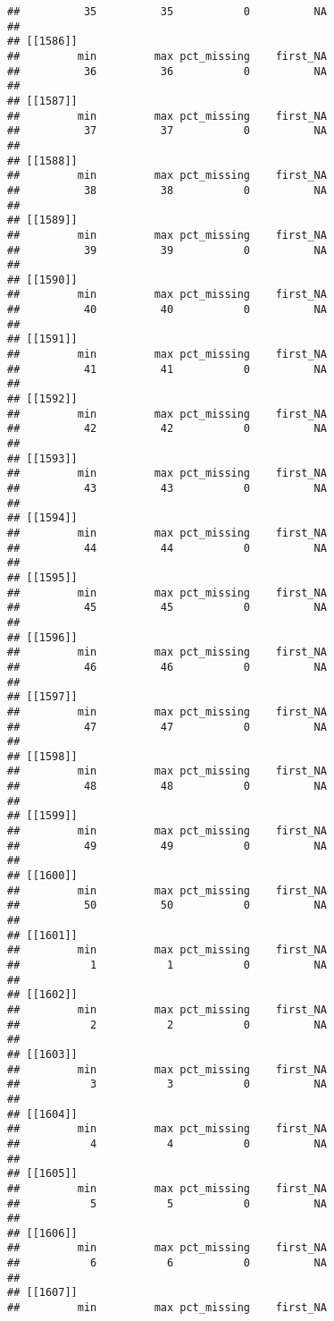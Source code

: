 \documentclass[
]{article}
\begin{document}
\begin{verbatim}
##          35          35           0          NA 
## 
## [[1586]]
##         min         max pct_missing    first_NA 
##          36          36           0          NA 
## 
## [[1587]]
##         min         max pct_missing    first_NA 
##          37          37           0          NA 
## 
## [[1588]]
##         min         max pct_missing    first_NA 
##          38          38           0          NA 
## 
## [[1589]]
##         min         max pct_missing    first_NA 
##          39          39           0          NA 
## 
## [[1590]]
##         min         max pct_missing    first_NA 
##          40          40           0          NA 
## 
## [[1591]]
##         min         max pct_missing    first_NA 
##          41          41           0          NA 
## 
## [[1592]]
##         min         max pct_missing    first_NA 
##          42          42           0          NA 
## 
## [[1593]]
##         min         max pct_missing    first_NA 
##          43          43           0          NA 
## 
## [[1594]]
##         min         max pct_missing    first_NA 
##          44          44           0          NA 
## 
## [[1595]]
##         min         max pct_missing    first_NA 
##          45          45           0          NA 
## 
## [[1596]]
##         min         max pct_missing    first_NA 
##          46          46           0          NA 
## 
## [[1597]]
##         min         max pct_missing    first_NA 
##          47          47           0          NA 
## 
## [[1598]]
##         min         max pct_missing    first_NA 
##          48          48           0          NA 
## 
## [[1599]]
##         min         max pct_missing    first_NA 
##          49          49           0          NA 
## 
## [[1600]]
##         min         max pct_missing    first_NA 
##          50          50           0          NA 
## 
## [[1601]]
##         min         max pct_missing    first_NA 
##           1           1           0          NA 
## 
## [[1602]]
##         min         max pct_missing    first_NA 
##           2           2           0          NA 
## 
## [[1603]]
##         min         max pct_missing    first_NA 
##           3           3           0          NA 
## 
## [[1604]]
##         min         max pct_missing    first_NA 
##           4           4           0          NA 
## 
## [[1605]]
##         min         max pct_missing    first_NA 
##           5           5           0          NA 
## 
## [[1606]]
##         min         max pct_missing    first_NA 
##           6           6           0          NA 
## 
## [[1607]]
##         min         max pct_missing    first_NA 

\end{verbatim}
\end{document}
